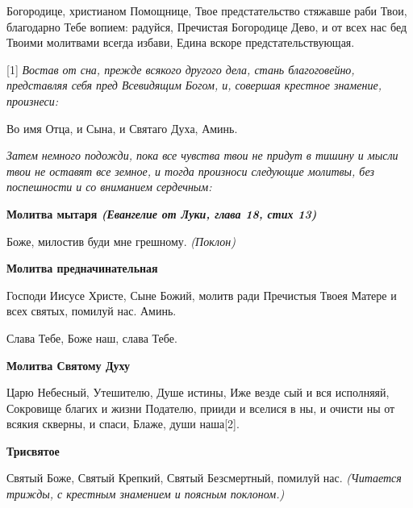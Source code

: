 Богородице, христианом Помощнице, Твое предстательство стяжавше раби Твои, благодарно Тебе вопием: радуйся, Пречистая Богородице Дево, и от всех нас бед Твоими молитвами всегда избави, Едина вскоре предстательствующая.


\mychapterending

 

[1]\itshape 
Востав от сна, прежде всякого другого дела, стань благоговейно,
представляя себя пред Всевидящим Богом, и, совершая крестное знамение,
произнеси:\normalfont{}



   Во имя Отца, и Сына, и Святаго Духа, Аминь.



 \itshape  Затем немного подожди, пока все чувства твои не придут в тишину и
мысли твои не оставят все земное, и тогда произноси следующие молитвы,
без поспешности и со вниманием сердечным:\normalfont{}



 

\bfseries Молитва мытаря \itshape (Евангелие от Луки, глава 18, стих 13)\normalfont{}\normalfont{}


   Боже, милостив буди мне грешному. \itshape  (Поклон)\normalfont{}



 

\bfseries Молитва предначинательная\normalfont{}


   Господи Иисусе Христе, Сыне Божий, молитв ради Пречистыя Твоея
Матере и всех святых, помилуй нас. Аминь.



   Слава Тебе, Боже наш, слава Тебе.



 

\bfseries Молитва Святому Духу\normalfont{}


   Царю Небесный, Утешителю, Душе истины, Иже везде сый и
вся исполняяй, Сокровище благих и жизни Подателю, прииди и
вселися в ны, и очисти ны от всякия скверны, и спаси, Блаже, души
наша[2].



 

\bfseries Трисвятое\normalfont{}


   Святый Боже, Святый Крепкий, Святый Безсмертный, помилуй нас. \itshape 
(Читается трижды, с крестным знамением и поясным поклоном.)
\normalfont{}



